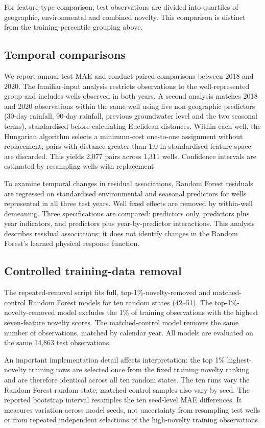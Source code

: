 \documentclass[conference]{IEEEtran}
\begin{document}
For feature-type comparison, test observations are divided into quartiles of geographic, environmental and combined novelty. This comparison is distinct from the training-percentile grouping above.

\subsection{Temporal comparisons}
We report annual test MAE and conduct paired comparisons between 2018 and 2020. The familiar-input analysis restricts observations to the well-represented group and includes wells observed in both years. A second analysis matches 2018 and 2020 observations within the same well using five non-geographic predictors (30-day rainfall, 90-day rainfall, previous groundwater level and the two seasonal terms), standardised before calculating Euclidean distances. Within each well, the Hungarian algorithm selects a minimum-cost one-to-one assignment without replacement; pairs with distance greater than 1.0 in standardised feature space are discarded. This yields 2,077 pairs across 1,311 wells. Confidence intervals are estimated by resampling wells with replacement.

To examine temporal changes in residual associations, Random Forest residuals are regressed on standardised environmental and seasonal predictors for wells represented in all three test years. Well fixed effects are removed by within-well demeaning. Three specifications are compared: predictors only, predictors plus year indicators, and predictors plus year-by-predictor interactions. This analysis describes residual associations; it does not identify changes in the Random Forest's learned physical response function.

\subsection{Controlled training-data removal}
The repeated-removal script fits full, top-1\%-novelty-removed and matched-control Random Forest models for ten random states (42--51). The top-1\%-novelty-removed model excludes the 1\% of training observations with the highest seven-feature novelty scores. The matched-control model removes the same number of observations, matched by calendar year. All models are evaluated on the same 14,863 test observations.

An important implementation detail affects interpretation: the top 1\% highest-novelty training rows are selected once from the fixed training novelty ranking and are therefore identical across all ten random states. The ten runs vary the Random Forest random state; matched-control samples also vary by seed. The reported bootstrap interval resamples the ten seed-level MAE differences. It measures variation across model seeds, not uncertainty from resampling test wells or from repeated independent selections of the high-novelty training observations.
\end{document}
